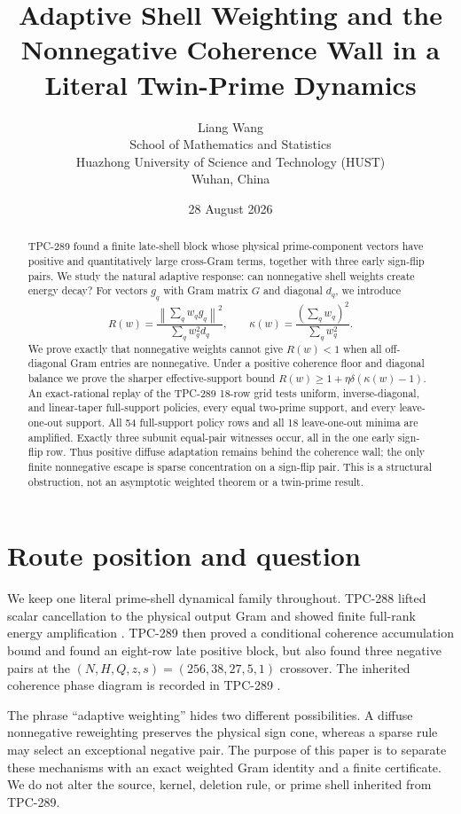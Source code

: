 \documentclass[10pt]{article}
\title{Adaptive Shell Weighting and the\\
Nonnegative Coherence Wall in a Literal Twin-Prime Dynamics}
\author{Liang Wang\\
School of Mathematics and Statistics\\
Huazhong University of Science and Technology (HUST)\\
Wuhan, China}
\date{28 August 2026}
\newcommand{\norm}[1]{\left\lVert #1\right\rVert}
\begin{document}
\maketitle

\begin{abstract}
TPC-289 found a finite late-shell block whose physical prime-component
vectors have positive and quantitatively large cross-Gram terms, together
with three early sign-flip pairs.  We study the natural adaptive response:
can nonnegative shell weights create energy decay?  For vectors $g_q$ with
Gram matrix $G$ and diagonal $d_q$, we introduce
\[
 R(w)=\frac{\norm{\sum_q w_qg_q}^2}{\sum_qw_q^2d_q},
 \qquad \kappa(w)=\frac{(\sum_qw_q)^2}{\sum_qw_q^2}.
\]
We prove exactly that nonnegative weights cannot give $R(w)<1$ when all
off-diagonal Gram entries are nonnegative.  Under a positive coherence floor
and diagonal balance we prove the sharper effective-support bound
$R(w)\ge 1+\eta\delta(\kappa(w)-1)$.  An exact-rational replay of the
TPC-289 18-row grid tests uniform, inverse-diagonal, and linear-taper
full-support policies, every equal two-prime support, and every leave-one-out
support.  All 54 full-support policy rows and all 18 leave-one-out minima are
amplified.  Exactly three subunit equal-pair witnesses occur, all in the one
early sign-flip row.  Thus positive diffuse adaptation remains behind the
coherence wall; the only finite nonnegative escape is sparse concentration on
a sign-flip pair.  This is a structural obstruction, not an asymptotic
weighted theorem or a twin-prime result.
\end{abstract}

\section{Route position and question}

We keep one literal prime-shell dynamical family throughout.  TPC-288 lifted
scalar cancellation to the physical output Gram and showed finite full-rank
energy amplification \cite{tpc288}.  TPC-289 then proved a conditional coherence
accumulation bound and found an eight-row late positive block, but also found
three negative pairs at the $(N,H,Q,z,s)=(256,38,27,5,1)$ crossover.
The inherited coherence phase diagram is recorded in TPC-289 \cite{tpc289}.

The phrase ``adaptive weighting'' hides two different possibilities.  A
diffuse nonnegative reweighting preserves the physical sign cone, whereas a
sparse rule may select an exceptional negative pair.  The purpose of this
paper is to separate these mechanisms with an exact weighted Gram identity
and a finite certificate.  We do not alter the source, kernel, deletion rule,
or prime shell inherited from TPC-289.
\end{document}
